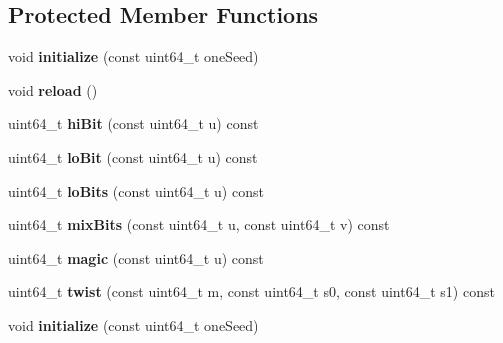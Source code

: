 \subsection*{Protected Member Functions}
\begin{DoxyCompactItemize}
\item 
\hypertarget{classMTRand_a0098d14773e1be9c50224cfbc5eb0df9}{void {\bfseries initialize} (const uint64\-\_\-t one\-Seed)}\label{classMTRand_a0098d14773e1be9c50224cfbc5eb0df9}

\item 
\hypertarget{classMTRand_a1d5fcb69d83f4d2fd653883c8352f86c}{void {\bfseries reload} ()}\label{classMTRand_a1d5fcb69d83f4d2fd653883c8352f86c}

\item 
\hypertarget{classMTRand_ad4a7632a7738a3b7fcf8dc3a082f4bca}{uint64\-\_\-t {\bfseries hi\-Bit} (const uint64\-\_\-t u) const }\label{classMTRand_ad4a7632a7738a3b7fcf8dc3a082f4bca}

\item 
\hypertarget{classMTRand_a1cd2fc67f5bbcd20138d34772e2e5816}{uint64\-\_\-t {\bfseries lo\-Bit} (const uint64\-\_\-t u) const }\label{classMTRand_a1cd2fc67f5bbcd20138d34772e2e5816}

\item 
\hypertarget{classMTRand_ad69ec4672916b2fb55f6b10d71d15515}{uint64\-\_\-t {\bfseries lo\-Bits} (const uint64\-\_\-t u) const }\label{classMTRand_ad69ec4672916b2fb55f6b10d71d15515}

\item 
\hypertarget{classMTRand_a27a04b4c5852664be5da01569678725c}{uint64\-\_\-t {\bfseries mix\-Bits} (const uint64\-\_\-t u, const uint64\-\_\-t v) const }\label{classMTRand_a27a04b4c5852664be5da01569678725c}

\item 
\hypertarget{classMTRand_a718b184ca793fa2dfde467c7c9c70892}{uint64\-\_\-t {\bfseries magic} (const uint64\-\_\-t u) const }\label{classMTRand_a718b184ca793fa2dfde467c7c9c70892}

\item 
\hypertarget{classMTRand_a6d191303b615284e333378edfea1d1d7}{uint64\-\_\-t {\bfseries twist} (const uint64\-\_\-t m, const uint64\-\_\-t s0, const uint64\-\_\-t s1) const }\label{classMTRand_a6d191303b615284e333378edfea1d1d7}

\item 
\hypertarget{classMTRand_a0098d14773e1be9c50224cfbc5eb0df9}{void {\bfseries initialize} (const uint64\-\_\-t one\-Seed)}\label{classMTRand_a0098d14773e1be9c50224cfbc5eb0df9}


\end{DoxyCompactItemize}
